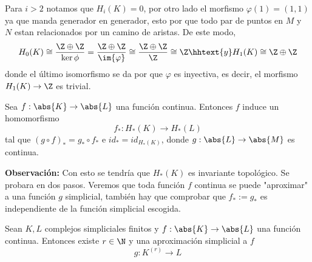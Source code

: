 \documentclass{article}
\begin{document}
\vspace{2mm}
\centerline{
}

\vspace{2mm}
\noindent Para $i>2$ notamos que $H_{i}(K)=0$, por otro lado el morfismo $\varphi(1)=(1,1)$ ya que
manda generador en generador, esto por que todo par de puntos en $M$ y $N$ estan relacionados por
un camino de aristas. De este modo,
\begin{equation*}
    H_{0}(K)\cong\frac{\Z\oplus\Z}{\ker{\phi}}=\frac{\Z\oplus\Z}{\im{\varphi}}
    \cong\frac{\Z\oplus\Z}{\Z}\cong\Z
    \hhtext{y}
    H_{1}(K)\cong\Z\oplus\Z
\end{equation*}
donde el último isomorfismo se da por que $\varphi$ es inyectiva, es decir, el morfismo 
$H_{1}(K)\to\Z$ es trivial.

\begin{teo}
    Sea $f:\abs{K}\to\abs{L}$ una función continua. Entonces $f$ induce un homomorfismo
    \begin{equation*}
        f_{*}:H_{*}(K)\to H_{*}(L)
    \end{equation*}
    tal que $(g\circ f)_{*}=g_{*}\circ f_{*}$ e $id_{*}=id_{H_{*}(K)}$, donde 
    $g:\abs{L}\to\abs{M}$ es continua.
\end{teo}

\noindent\textbf{Observación:} Con esto se tendría que $H_{*}(K)$ es invariante topológico. Se
probara en dos pasos. Veremos que toda función $f$ continua se puede "aproximar" a una función $g$
simplicial, también hay que comprobar que $f_{*}:=g_{*}$ es independiente de la función simplicial
escogida.

\begin{teo}
    Sean $K,L$ complejos simpliciales finitos y $f:\abs{K}\to\abs{L}$ una función continua. 
    Entonces existe $r\in\N$ y una aproximación simplicial a $f$
    \begin{equation*}
        g:K^{(r)}\to L
    \end{equation*}
\end{teo}
\end{document}
